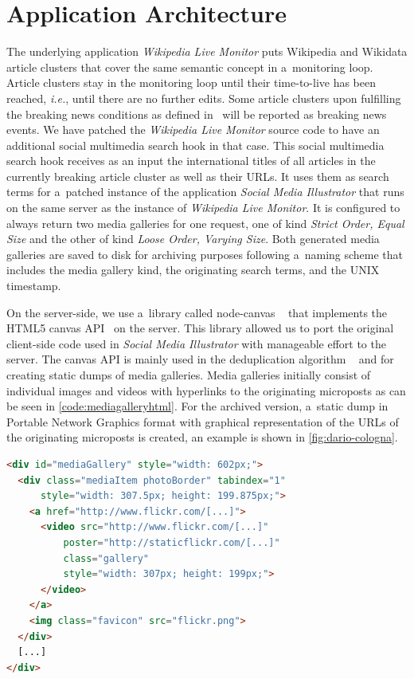 \documentclass{sig-alternate}
\begin{document}
\section{Application Architecture}
\label{sec:application-architecture}
\selectfont

The underlying application \emph{Wikipedia Live Monitor}
puts Wiki\-pedia and Wikidata article clusters
that cover the same semantic concept
in a~monitoring loop.
Article clusters stay in the monitoring loop until
their time-to-live has been reached,
\emph{i.e.}, until there are no further edits.
Some article clusters upon fulfilling the breaking news conditions
as defined in~\cite{steiner2013mjnomore}
will be reported as breaking news events.
We have patched the \emph{Wikipedia Live Monitor} source code
to have an additional social multimedia search hook in that case.
This social multimedia search hook receives as an input
the international titles of all articles
in the currently breaking article cluster as well as their URLs.
It uses them as search terms for a~patched instance
of the application \emph{Social Media Illustrator}
that runs on the same server
as the instance of \emph{Wikipedia Live Monitor}.
It is configured to always return two media galleries
for one request, one of kind \emph{Strict Order, Equal Size}
and the other of kind \emph{Loose Order, Varying Size}.
Both generated media galleries are saved to disk
for archiving purposes following a~naming scheme
that includes the media gallery kind,
the originating search terms, and the UNIX timestamp.

On the server-side, we use a~library called node-canvas%
~\cite{holowaychuk2013nodecanvas} that implements the
HTML5 canvas API~\cite{cabanier2013canvas} on the server.
This library allowed us to port the original client-side code 
used in \emph{Social Media Illustrator}
with manageable effort to the server.
The canvas API is mainly used in the deduplication algorithm%
~\cite{steiner2013clustering}
and for creating static dumps of media galleries.
Media galleries initially consist of individual images and videos
with hyperlinks to the originating microposts
as can be seen in \autoref{code:mediagalleryhtml}.
For the archived version, a~static dump
in Portable Network Graphics format
with graphical representation of the URLs
of the originating microposts is created,
an example is shown in \autoref{fig:dario-cologna}.

\begin{lstlisting}[caption={Simplified \emph{Strict Order, Equal Size}
  HTML code}, label=code:mediagalleryhtml, language=HTML]
<div id="mediaGallery" style="width: 602px;">
  <div class="mediaItem photoBorder" tabindex="1"
      style="width: 307.5px; height: 199.875px;">
    <a href="http://www.flickr.com/[...]">
      <video src="http://www.flickr.com/[...]"
          poster="http://staticflickr.com/[...]"
          class="gallery"
          style="width: 307px; height: 199px;">
      </video>
    </a>
    <img class="favicon" src="flickr.png">
  </div>
  [...]
</div>
\end{lstlisting}
\end{document}
